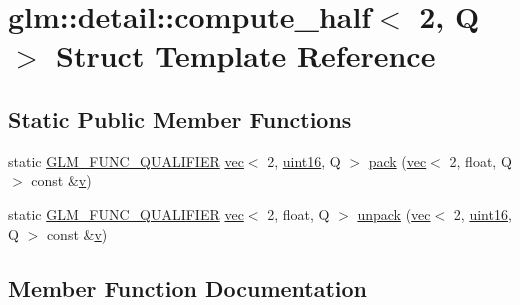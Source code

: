 \hypertarget{structglm_1_1detail_1_1compute__half_3_012_00_01_q_01_4}{}\section{glm\+:\+:detail\+:\+:compute\+\_\+half$<$ 2, Q $>$ Struct Template Reference}
\label{structglm_1_1detail_1_1compute__half_3_012_00_01_q_01_4}
\subsection*{Static Public Member Functions}
\begin{DoxyCompactItemize}
\item 
static \hyperlink{setup_8hpp_a33fdea6f91c5f834105f7415e2a64407}{G\+L\+M\+\_\+\+F\+U\+N\+C\+\_\+\+Q\+U\+A\+L\+I\+F\+I\+ER} \hyperlink{structglm_1_1vec}{vec}$<$ 2, \hyperlink{namespaceglm_1_1detail_a47b2a7d006d187338e8031a352d1ce56}{uint16}, Q $>$ \hyperlink{structglm_1_1detail_1_1compute__half_3_012_00_01_q_01_4_aee41de18808e48e59c26b1fcd66fbc00}{pack} (\hyperlink{structglm_1_1vec}{vec}$<$ 2, float, Q $>$ const \&\hyperlink{_s_d_l__opengl_8h_a10a82eabcb59d2fcd74acee063775f90}{v})
\item 
static \hyperlink{setup_8hpp_a33fdea6f91c5f834105f7415e2a64407}{G\+L\+M\+\_\+\+F\+U\+N\+C\+\_\+\+Q\+U\+A\+L\+I\+F\+I\+ER} \hyperlink{structglm_1_1vec}{vec}$<$ 2, float, Q $>$ \hyperlink{structglm_1_1detail_1_1compute__half_3_012_00_01_q_01_4_a14c541423f621ba292c968245435c6a7}{unpack} (\hyperlink{structglm_1_1vec}{vec}$<$ 2, \hyperlink{namespaceglm_1_1detail_a47b2a7d006d187338e8031a352d1ce56}{uint16}, Q $>$ const \&\hyperlink{_s_d_l__opengl_8h_a10a82eabcb59d2fcd74acee063775f90}{v})
\end{DoxyCompactItemize}


\subsection{Member Function Documentation}
\mbox{\label{structglm_1_1detail_1_1compute__half_3_012_00_01_q_01_4_aee41de18808e48e59c26b1fcd66fbc00}} 
